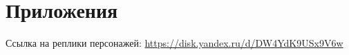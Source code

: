 \documentclass[oneside,a4paper,14pt]{extarticle}
\begin{document}
\section*{Приложения}
Ссылка на реплики персонажей:
\url{https://disk.yandex.ru/d/DW4YdK9USx9V6w}
\end{document}
